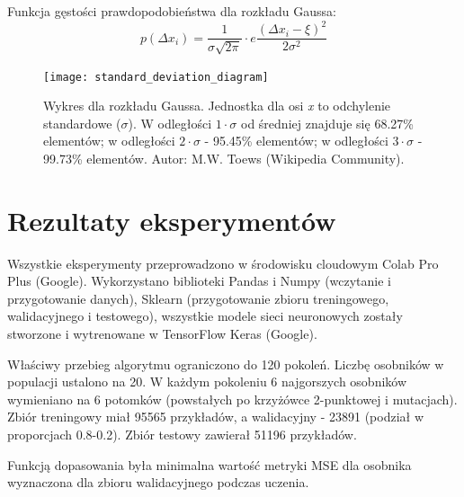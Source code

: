 \documentclass[a4paper,12pt]{article}
\numberwithin{figure}{section}
\begin{document}
    \bigskip

    \noindent
    \begin{minipage}[H]{\textwidth}
        \setlength\parindent{17pt} Funkcja gęstości prawdopodobieństwa dla rozkładu Gaussa: \\
        \begin{equation}
            \label{eq:mutation_probability distribution}
            p(\Delta x_{i}) = \frac{1}{\sigma \sqrt {2 \pi}} \cdot e \frac{(\Delta x_{i} - \xi)^{2}}{2 \sigma^{2}}
        \end{equation}
    \end{minipage}

    \bigskip

    \begin{figure}[H]
        \centering
        \texttt{[image: standard\_deviation\_diagram]}
        \caption{Wykres dla rozkładu Gaussa. Jednostka dla osi \textit{x} to odchylenie standardowe ($\sigma$). W odległości $1 \cdot \sigma$ od średniej znajduje się 68.27\% elementów; w odległości $2 \cdot \sigma$ - 95.45\% elementów; w odległości $3 \cdot \sigma$ - 99.73\% elementów. Autor: M.W. Toews (Wikipedia Community).}
        \label{fig:standard_deviation_diagram}
    \end{figure}

    \newpage


    \section{Rezultaty eksperymentów}

    Wszystkie eksperymenty przeprowadzono w środowisku cloudowym Colab Pro Plus (Google). Wykorzystano biblioteki Pandas i Numpy (wczytanie i przygotowanie danych), Sklearn (przygotowanie zbioru treningowego, walidacyjnego i testowego), wszystkie modele sieci neuronowych zostały stworzone i wytrenowane w TensorFlow Keras (Google).

    \bigskip

    Właściwy przebieg algorytmu ograniczono do 120 pokoleń. Liczbę osobników w populacji ustalono na 20. W każdym pokoleniu 6 najgorszych osobników wymieniano na 6 potomków (powstałych po krzyżówce 2-punktowej i mutacjach). Zbiór treningowy miał 95565 przykładów, a walidacyjny - 23891 (podział w proporcjach 0.8-0.2). Zbiór testowy zawierał 51196 przykładów.

    \bigskip

    Funkcją dopasowania była minimalna wartość metryki MSE dla osobnika wyznaczona dla zbioru walidacyjnego podczas uczenia.
\end{document}
